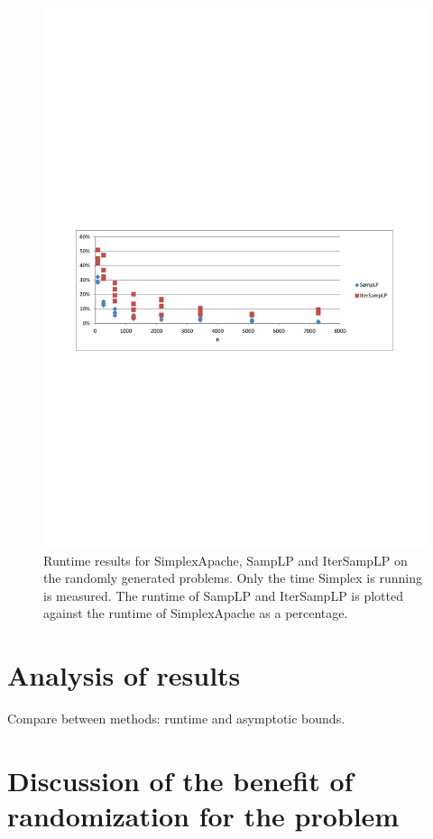\documentclass[nocopyrightspace]{acm_proc_article-sp}
\begin{document}
\begin{figure}[h!]
\includegraphics[width=\columnwidth]{../Results/simplexruntime_relative_simplex.pdf}
\caption{Runtime results for SimplexApache, SampLP and IterSampLP on the randomly generated problems. Only the time Simplex is running is measured. The runtime of SampLP and IterSampLP is plotted against the runtime of SimplexApache as a percentage.}
\label{fig:simplexruntime_relative_simplex}
\end{figure}



\section{Analysis of results}
Compare between methods: runtime and asymptotic bounds.

\section{Discussion of the benefit of randomization for the problem}
\end{document}
